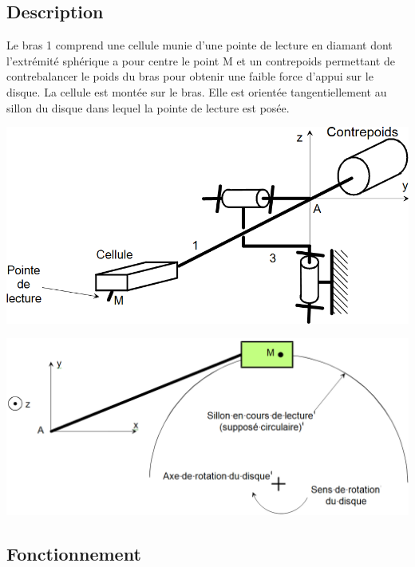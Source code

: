 \documentclass[10pt]{article}
\begin{document}
\subsection*{Description}


Le bras 1 comprend une cellule munie d'une pointe de lecture en diamant dont l'extrémité sphérique a pour centre le point M et un contrepoids permettant de contrebalancer le poids du bras pour obtenir une faible force d'appui sur le disque. La cellule est montée sur le bras. Elle est orientée tangentiellement au sillon du disque dans lequel la pointe de lecture est posée.

\begin{minipage}[c]{.48\linewidth}
\begin{center}
\includegraphics[width=.95\textwidth]{images/fig3}
\end{center}
\end{minipage} \hfill
\begin{minipage}[c]{.48\linewidth}
\begin{center}
\includegraphics[width=.95\textwidth]{images/fig4}
\end{center}
\end{minipage}


\subsection*{Fonctionnement}
\end{document}
